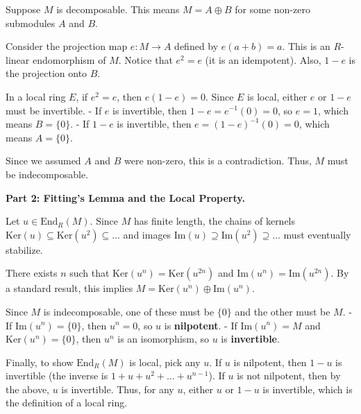 \begin{solution}
Suppose $M$ is decomposable. This means $M = A \oplus B$ for some non-zero submodules $A$ and $B$.

\bigskip

Consider the projection map $e: M \to A$ defined by $e(a+b) = a$. This is an $R$-linear endomorphism of $M$. Notice that $e^2 = e$ (it is an idempotent). Also, $1-e$ is the projection onto $B$.

\bigskip

In a local ring $E$, if $e^2 = e$, then $e(1-e) = 0$. Since $E$ is local, either $e$ or $1-e$ must be invertible. 
- If $e$ is invertible, then $1-e = e^{-1}(0) = 0$, so $e=1$, which means $B=\{0\}$.
- If $1-e$ is invertible, then $e = (1-e)^{-1}(0) = 0$, which means $A=\{0\}$.

\bigskip

Since we assumed $A$ and $B$ were non-zero, this is a contradiction. Thus, $M$ must be indecomposable.

\bigskip

\textbf{Part 2: Fitting's Lemma and the Local Property.}

Let $u \in \mathrm{End}_R(M)$. Since $M$ has finite length, the chains of kernels $\mathrm{Ker}(u) \subseteq \mathrm{Ker}(u^2) \subseteq \dots$ and images $\mathrm{Im}(u) \supseteq \mathrm{Im}(u^2) \supseteq \dots$ must eventually stabilize.

\bigskip

There exists $n$ such that $\mathrm{Ker}(u^n) = \mathrm{Ker}(u^{2n})$ and $\mathrm{Im}(u^n) = \mathrm{Im}(u^{2n})$. By a standard result, this implies $M = \mathrm{Ker}(u^n) \oplus \mathrm{Im}(u^n)$.

\bigskip

Since $M$ is indecomposable, one of these must be $\{0\}$ and the other must be $M$.
- If $\mathrm{Im}(u^n) = \{0\}$, then $u^n = 0$, so $u$ is \textbf{nilpotent}.
- If $\mathrm{Im}(u^n) = M$ and $\mathrm{Ker}(u^n) = \{0\}$, then $u^n$ is an isomorphism, so $u$ is \textbf{invertible}.

\bigskip

Finally, to show $\mathrm{End}_R(M)$ is local, pick any $u$. If $u$ is nilpotent, then $1-u$ is invertible (the inverse is $1 + u + u^2 + \dots + u^{n-1}$). If $u$ is not nilpotent, then by the above, $u$ is invertible. Thus, for any $u$, either $u$ or $1-u$ is invertible, which is the definition of a local ring.
\end{solution}


